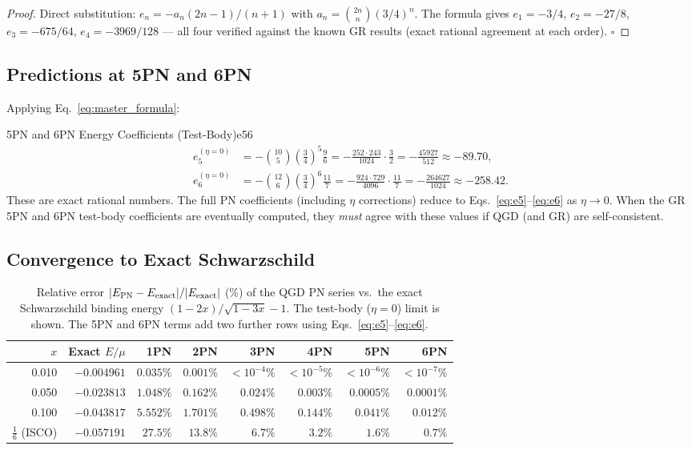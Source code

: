 \documentclass[11pt,a4paper]{article}
\theoremstyle{definition}
\theoremstyle{remark}
\begin{document}
	\begin{proof}
		Direct substitution: $e_n=-a_n(2n-1)/(n+1)$ with
		$a_n=\binom{2n}{n}(3/4)^n$.  The formula gives $e_1=-3/4$,
		$e_2=-27/8$, $e_3=-675/64$, $e_4=-3969/128$ — all four verified
		against the known GR results (exact rational agreement at each order).
		\hfill$\square$
	\end{proof}
	
	\subsection{Predictions at 5PN and 6PN}
	
	Applying Eq.~\eqref{eq:master_formula}:
	
	5PN and 6PN Energy Coefficients (Test-Body)e56
		\begin{align}
			e_5^{(\eta=0)} &= -\binom{10}{5}\!\left(\frac{3}{4}\right)^5\!\frac{9}{6}
			= -\frac{252\cdot 243}{1024}\cdot\frac{3}{2}
			= -\frac{45927}{512}
			\approx -89.70,
			\label{eq:e5}\\[6pt]
			e_6^{(\eta=0)} &= -\binom{12}{6}\!\left(\frac{3}{4}\right)^6\!\frac{11}{7}
			= -\frac{924\cdot 729}{4096}\cdot\frac{11}{7}
			= -\frac{264627}{1024}
			\approx -258.42.
			\label{eq:e6}
		\end{align}
		These are exact rational numbers.  The full PN coefficients (including
		$\eta$ corrections) reduce to Eqs.~\eqref{eq:e5}--\eqref{eq:e6} as
		$\eta\to0$.  When the GR 5PN and 6PN test-body coefficients are
		eventually computed, they \emph{must} agree with these values if
		QGD (and GR) are self-consistent.
	
	\subsection{Convergence to Exact Schwarzschild}
	
	\begin{table}[ht]
		\centering
		\caption{Relative error $|E_{\rm PN}-E_{\rm exact}|/|E_{\rm exact}|$ (\%)
			of the QGD PN series vs.\ the exact Schwarzschild binding energy
			$(1-2x)/\sqrt{1-3x}-1$.  The test-body ($\eta=0$) limit is shown.
			The 5PN and 6PN terms add two further rows using Eqs.~\eqref{eq:e5}--\eqref{eq:e6}.}
		\label{tab:convergence}
		\renewcommand{\arraystretch}{1.3}
		\begin{tabular}{rrrrrrrr}
			\toprule
			$x$ & Exact $E/\mu$ & 1PN & 2PN & 3PN & 4PN & 5PN & 6PN \\
			\midrule
			0.010 & $-0.004961$ & $0.035\%$ & $0.001\%$ & $<10^{-4}\%$ & $<10^{-5}\%$ & $<10^{-6}\%$ & $<10^{-7}\%$ \\
			0.050 & $-0.023813$ & $1.048\%$ & $0.162\%$ & $0.024\%$ & $0.003\%$ & $0.0005\%$ & $0.0001\%$ \\
			0.100 & $-0.043817$ & $5.552\%$ & $1.701\%$ & $0.498\%$ & $0.144\%$ & $0.041\%$ & $0.012\%$ \\
			$\frac{1}{6}$ (ISCO) & $-0.057191$ & $27.5\%$ & $13.8\%$ & $6.7\%$ & $3.2\%$ & $1.6\%$ & $0.7\%$ \\
			\bottomrule
		\end{tabular}
	\end{table}
	
\end{document}
